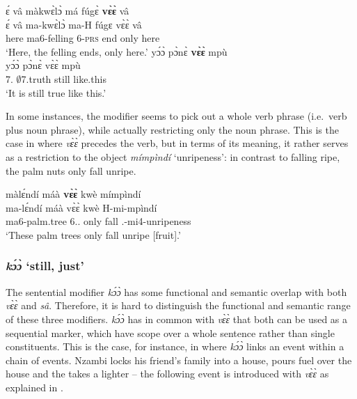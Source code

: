 \ea \label{vee5}
  \glll ɛ́ vâ màkwɛ̀lɔ̀ má fúgɛ̀ {\bfseries vɛ̀ɛ̀} vâ \\
         ɛ́ vâ ma-kwɛ̀lɔ̀ ma-H fúgɛ vɛ̀ɛ̀ vâ \\
         {\LOC} here ma6-felling 6-\textsc{prs} end only here\\
    \trans `Here, the felling ends, only here.'
\ex \label{vee6}
  \glll yɔ́ɔ̀ pɔ̀nɛ̀ {\bfseries vɛ̀ɛ̀} mpù \\
        yɔ́ɔ̀ pɔ̀nɛ̀ vɛ̀ɛ̀ mpù \\
         7.{\COP} $\emptyset$7.truth still like.this\\
    \trans `It is still true like this.'
\z

In some instances, the modifier seems to pick out a whole verb phrase (i.e.\ verb plus noun phrase), while actually restricting only the noun phrase. This is the case in  where {\itshape vɛ̀ɛ̀} precedes the verb, but in terms of its meaning, it rather serves as a restriction to the object {\itshape mímpìndí} `unripeness': in contrast to falling ripe, the palm nuts only fall unripe.


\ea \label{vee7}
  \glll  màlɛ́ndí máà {\bfseries vɛ̀ɛ̀} kwè mímpìndí \\
         ma-lɛ́ndí máà vɛ̀ɛ̀ kwè H-mi-mpìndí \\
           ma6-palm.tree 6.{\DEM}.{\PROX} only fall {\OBJ}.{\LINK}-mi4-unripeness\\
    \trans `These palm trees only fall unripe [fruit].'
\z






\subsubsection*{{\itshape kɔ́ɔ̀} `still, just'}
The sentential modifier {\itshape kɔ́ɔ̀} has some functional and semantic overlap with both {\itshape vɛ̀ɛ̀} and {\itshape sâ}. Therefore, it is hard to distinguish the functional and semantic range of these three modifiers. {\itshape kɔ́ɔ̀} has in common with {\itshape vɛ̀ɛ̀} that both can be used as a sequential marker, which have scope over a whole sentence rather than single constituents. This is the case, for instance, in  where {\itshape kɔ́ɔ̀} links an event within a chain of events. Nzambi locks his friend's family into a house, pours fuel over the house and the takes a lighter -- the following event is introduced with {\itshape vɛ̀ɛ̀} as explained in .

